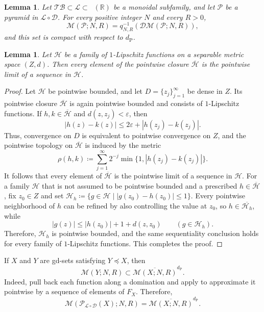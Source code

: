 \documentclass{amsart}
\theoremstyle{plain}
\newtheorem{lemma}[theorem]{Lemma}
\theoremstyle{definition}
\theoremstyle{remark}
\newcommand{\R}{\mathbb{R}}
\newcommand{\D}{\mathcal{D}}
\newcommand{\M}{\mathcal{M}}
\newcommand{\DM}{\mathcal{DM}}
\renewcommand{\L}{\mathcal{L}}
\newcommand{\TB}{\mathcal{TB}}
\DeclareMathOperator{\lipone}{Lip_1}
\newcommand{\dpr}{d_{\operatorname{P}}}
\begin{document}
\begin{lemma}
\label{lem:l-pyramid-measurement-closed}
Let $\TB\subset\L\subset\lipone(\R)$ be a monoidal subfamily, and let $\mathcal P$ be a pyramid in $\L\circ\D$. For every positive integer $N$ and every $R>0$,
\begin{equation}
\label{eq:l-ordered-feature-preimage}
\M(\mathcal P;N,R)=q_{N,R}^{-1}(\DM(\mathcal P;N,R)),
\end{equation}
and this set is compact with respect to $\dpr$.
\end{lemma}

\begin{lemma}
\label{lem:pointwise-closure-sequential}
Let $\mathcal H$ be a family of $1$-Lipschitz functions on a separable metric space $(Z,d)$. Then every element of the pointwise closure $\overline{\mathcal H}$ is the pointwise limit of a sequence in $\mathcal H$.
\end{lemma}

\begin{proof}
Let $\mathcal H$ be pointwise bounded, and let $D=\{z_j\}_{j=1}^{\infty}$ be dense in $Z$. Its pointwise closure $\overline{\mathcal H}$ is again pointwise bounded and consists of $1$-Lipschitz functions. If $h,k\in\overline{\mathcal H}$ and $d(z,z_j)<\varepsilon$, then
\[|h(z)-k(z)|\leq2\varepsilon+|h(z_j)-k(z_j)|.\]
Thus, convergence on $D$ is equivalent to pointwise convergence on $Z$, and the pointwise topology on $\overline{\mathcal H}$ is induced by the metric
\[\rho(h,k)\coloneqq\sum_{j=1}^{\infty}2^{-j}\min\{1,|h(z_j)-k(z_j)|\}.\]
It follows that every element of $\overline{\mathcal H}$ is the pointwise limit of a sequence in $\mathcal H$. For a family $\mathcal H$ that is not assumed to be pointwise bounded and a prescribed $h\in\overline{\mathcal H}$, fix $z_0\in Z$ and set $\mathcal H_h\coloneqq\{g\in\mathcal H\mid |g(z_0)-h(z_0)|\leq1\}$. Every pointwise neighborhood of $h$ can be refined by also controlling the value at $z_0$, so $h\in\overline{\mathcal H_h}$, while
\[|g(z)|\leq |h(z_0)|+1+d(z,z_0)\qquad(g\in\mathcal H_h).\]
Therefore, $\mathcal H_h$ is pointwise bounded, and the same sequentiality conclusion holds for every family of $1$-Lipschitz functions. This completes the proof.
\end{proof}

If $X$ and $Y$ are gd-sets satisfying $Y\preceq X$, then
\begin{equation}
\label{eq:measurement-domination-monotonicity}
\M(Y;N,R)\subset\overline{\M(X;N,R)}^{\dpr}.
\end{equation}
Indeed, pull back each function along a domination and apply  to approximate it pointwise by a sequence of elements of $F_X$. Therefore,
\begin{equation}
\label{eq:associated-pyramid-measurement}
\M(\mathcal P_{\L\circ\D}(X);N,R)=\overline{\M(X;N,R)}^{\dpr}.
\end{equation}
\end{document}
